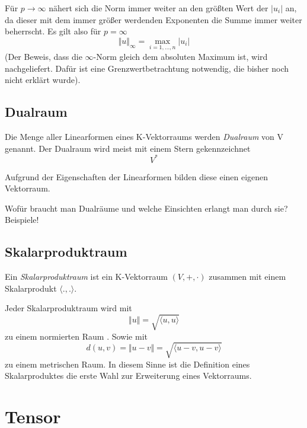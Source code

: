 Für $p \longrightarrow \infty$ nähert sich die Norm immer weiter an den größten Wert der $\vert u_i \vert$ an, da dieser mit dem immer größer werdenden Exponenten die Summe immer weiter beherrscht. Es gilt also für $p=\infty$
\[
\Vert u \Vert_\infty = \max_{i=1,\dots, n}  \vert u_i\vert
\]
(Der Beweis, dass die $\infty$-Norm gleich dem absoluten Maximum ist, wird nachgeliefert. Dafür ist eine Grenzwertbetrachtung notwendig, die bisher noch nicht erklärt wurde).

\subsection{Dualraum}

\begin{definition}
Die Menge aller Linearformen eines K-Vektorraums werden \emph{Dualraum} von V genannt. Der Dualraum wird meist mit einem Stern gekennzeichnet
\[V^* \]
\end{definition}

Aufgrund der Eigenschaften der Linearformen bilden diese einen eigenen Vektorraum. 

\begin{TODO}
Wofür braucht man Dualräume und welche Einsichten erlangt man durch sie? Beispiele!
\end{TODO}




\subsection{Skalarproduktraum}

\begin{definition}\label{skpr}
Ein \emph{Skalarproduktraum} ist ein K-Vektorraum $(V,+,\cdot)$ zusammen mit einem Skalarprodukt $\langle .,. \rangle$.
\end{definition}

Jeder Skalarproduktraum wird mit 
\[ \Vert u \Vert = \sqrt{\langle u,u \rangle} \]
zu einem normierten Raum . Sowie mit 
\[ 
d(u,v) = \Vert u-v \Vert = \sqrt{\langle u-v,u-v \rangle}
\]
zu einem metrischen Raum.  In diesem Sinne ist die Definition eines Skalarproduktes die erste Wahl zur Erweiterung eines Vektorraums. 



\section{Tensor}

